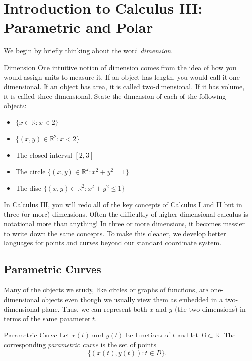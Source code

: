 \chapter{Introduction to Calculus III: Parametric and Polar}

We begin by briefly thinking about the word \emph{dimension}.

\begin{exercise}{Dimension \Coffeecup} 
One intuitive notion of dimension comes from the idea of how you would assign units to measure it.  If an object has length, you would call it one-dimensional.  If an object has area, it is called two-dimensional.  If it has volume, it is called three-dimensional.  State the dimension of each of the following objects:

\begin{itemize}
\item $\lbrace x\in\mathbb{R} : x<2 \rbrace$
\item $\lbrace (x,y)\in\mathbb{R}^2 : x<2 \rbrace$
\item The closed interval $[2,3]$
\item The circle $\lbrace (x,y)\in\mathbb{R}^2 : x^2+y^2=1 \rbrace$
\item The disc $\lbrace (x,y)\in\mathbb{R}^2 : x^2+y^2\leq 1 \rbrace$
\end{itemize}
\end{exercise}

In Calculus III, you will redo all of the key concepts of Calculus I and II but in three (or more) dimensions.  Often the difficultly of higher-dimensional calculus is notational more than anything!  In three or more dimensions, it becomes messier to write down the same concepts.  To make this cleaner, we develop better languages for points and curves beyond our standard coordinate system.

\section{Parametric Curves}

Many of the objects we study, like circles or graphs of functions, are one-dimensional objects even though we usually view them as embedded in a two-dimensional plane.  Thus, we can represent both $x$ and $y$ (the two dimensions) in terms of the same parameter $t$.

\begin{definition}{Parametric Curve}
Let $x(t)$ and $y(t)$ be functions of $t$ and let $D \subset \mathbb{R}$.  The corresponding \emph{parametric curve} is the set of points $$\lbrace\left(x(t),y(t)\right): t\in D \rbrace. $$ \end{definition}

